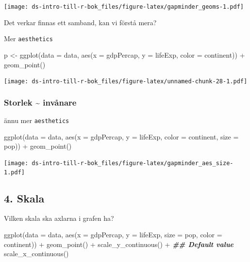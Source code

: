 \documentclass[
]{book}
\newenvironment{Shaded}{\begin{snugshade}}{\end{snugshade}}
\newcommand{\AttributeTok}[1]{\textcolor[rgb]{0.77,0.63,0.00}{#1}}
\newcommand{\DocumentationTok}[1]{\textcolor[rgb]{0.56,0.35,0.01}{\textbf{\textit{#1}}}}
\newcommand{\FunctionTok}[1]{\textcolor[rgb]{0.00,0.00,0.00}{#1}}
\newcommand{\NormalTok}[1]{#1}
\newcommand{\OtherTok}[1]{\textcolor[rgb]{0.56,0.35,0.01}{#1}}
\newcommand{\SpecialCharTok}[1]{\textcolor[rgb]{0.00,0.00,0.00}{#1}}
\begin{document}
\texttt{[image: ds-intro-till-r-bok\_files/figure-latex/gapminder\_geoms-1.pdf]}

Det verkar finnas ett samband, kan vi förstå mera?

Mer \texttt{aesthetics}

\begin{Shaded}
\begin{Highlighting}[]
\NormalTok{p }\OtherTok{\textless{}{-}} \FunctionTok{ggplot}\NormalTok{(}\AttributeTok{data =}\NormalTok{ data,}
            \FunctionTok{aes}\NormalTok{(}\AttributeTok{x =}\NormalTok{ gdpPercap,}
                \AttributeTok{y =}\NormalTok{ lifeExp,}
                \AttributeTok{color =}\NormalTok{ continent)) }\SpecialCharTok{+}
  \FunctionTok{geom\_point}\NormalTok{()}
\end{Highlighting}
\end{Shaded}

\texttt{[image: ds-intro-till-r-bok\_files/figure-latex/unnamed-chunk-28-1.pdf]}

\hypertarget{storlek-invuxe5nare}{%
\subsubsection{Storlek \textasciitilde{} invånare}\label{storlek-invuxe5nare}}

ännu mer \texttt{aesthetics}

\begin{Shaded}
\begin{Highlighting}[]
\FunctionTok{ggplot}\NormalTok{(}\AttributeTok{data =}\NormalTok{ data,}
       \FunctionTok{aes}\NormalTok{(}\AttributeTok{x =}\NormalTok{ gdpPercap,}
                     \AttributeTok{y =}\NormalTok{ lifeExp,}
                     \AttributeTok{color =}\NormalTok{ continent,}
                     \AttributeTok{size =}\NormalTok{ pop)) }\SpecialCharTok{+} 
  \FunctionTok{geom\_point}\NormalTok{()}
\end{Highlighting}
\end{Shaded}

\texttt{[image: ds-intro-till-r-bok\_files/figure-latex/gapminder\_aes\_size-1.pdf]}

\hypertarget{skala}{%
\subsection{4. Skala}\label{skala}}

Vilken skala ska axlarna i grafen ha?

\begin{Shaded}
\begin{Highlighting}[]
\FunctionTok{ggplot}\NormalTok{(}\AttributeTok{data =}\NormalTok{ data, }\FunctionTok{aes}\NormalTok{(}\AttributeTok{x =}\NormalTok{ gdpPercap, }\AttributeTok{y =}\NormalTok{ lifeExp,}
                                  \AttributeTok{size =}\NormalTok{ pop, }\AttributeTok{color =}\NormalTok{ continent)) }\SpecialCharTok{+}
  \FunctionTok{geom\_point}\NormalTok{() }\SpecialCharTok{+}
  \FunctionTok{scale\_y\_continuous}\NormalTok{() }\SpecialCharTok{+} \DocumentationTok{\#\# Default value}
  \FunctionTok{scale\_x\_continuous}\NormalTok{() }
\end{Highlighting}
\end{Shaded}
\end{document}
